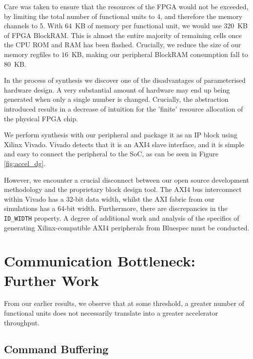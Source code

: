 \documentclass[a4paper,8pt]{report}
\begin{document}
Care was taken to ensure that the resources of the FPGA would not be exceeded,
by limiting the total number of functional units to 4, and therefore the memory
channels to 5. With $64$~KB of memory per functional unit, we would use $320$~KB of FPGA
BlockRAM. This is almost the entire majority of remaining cells once the CPU ROM
and RAM has been flashed. Crucially, we reduce the size of our memory regfiles
to $16$~KB, making our peripheral BlockRAM consumption fall to $80$~KB.

In the process of synthesis we discover one of the disadvantages of
parameterised hardware design. A very substantial amount of hardware may end up
being generated when only a single number is changed. Crucially, the abstraction
introduced results in a decrease of intuition for the 'finite' resource
allocation of the physical FPGA chip.

We perform synthesis with our peripheral and package it as an IP block using
Xilinx Vivado. Vivado detects that it is an AXI4 slave interface, and it is
simple and easy to connect the peripheral to the SoC, as can be seen in Figure
\ref{fig:accel_dg}.

However, we encounter a crucial disconnect between our open source development
methodology and the proprietary block design tool. The AXI4 bus interconnect within
Vivado has a 32-bit data width, whilst the AXI fabric from our simulations has a
64-bit width. Furthermore, there are discrepancies in the \texttt{ID\_WIDTH}
property. A degree of additional work and analysis of the specifics of
generating Xilinx-compatible AXI4 peripherals from Bluespec must be conducted.

\chapter{Communication Bottleneck: Further Work}
From our earlier results, we observe that at some threshold, a greater number of
functional units does not necessarily translate into a greater accelerator
throughput. 

\section{Command Buffering}
\end{document}
